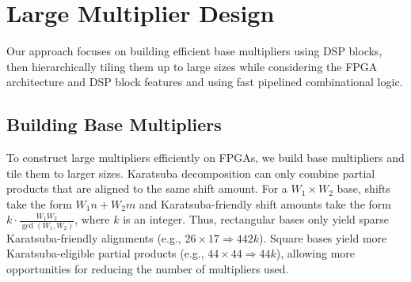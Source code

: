 \documentclass[conference]{IEEEtran}
\begin{document}


% 




\section{Large Multiplier Design} \label{sec_large_mult_design}
Our approach focuses on building efficient base multipliers using DSP blocks, then hierarchically tiling them up to large sizes while considering the FPGA architecture and DSP block features and using fast pipelined combinational logic.
 
\subsection{Building Base Multipliers} \label{sec_build_base_mult}


To construct large multipliers efficiently on FPGAs, we build base multipliers and tile them to larger sizes.
Karatsuba decomposition can only combine partial products that are aligned to the same shift amount.
For a $W_1\times W_2$ base, shifts take the form $W_1 n + W_2 m$ and Karatsuba-friendly shift amounts take the form $k\cdot\frac{W_1 W_2}{\gcd(W_1, W_2)}$, where $k$ is an integer.
Thus, rectangular bases only yield sparse Karatsuba-friendly alignments (e.g., $26\times17\Rightarrow 442k$).
Square bases yield more Karatsuba-eligible partial products (e.g., $44\times44\Rightarrow 44k$), allowing more opportunities for reducing the number of multipliers used.
\end{document}
